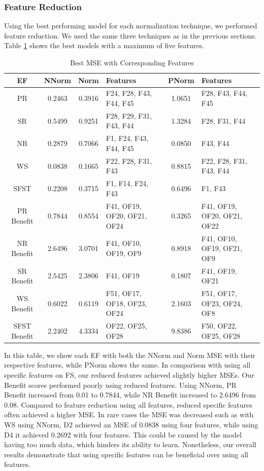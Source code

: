 \documentclass[12pt,letterpaper]{article}
\begin{document}
\subsubsection{Feature Reduction}

Using the best performing model for each normalization technique, we performed feature reduction.
We used the same three techniques as in the previous sections.
Table \ref{reg_spec_tab:featred_res} shows the best models with a maximum of five features.

\begin{table}[H]
\centering
\begin{tabular}{|c|c|c|p{2.5cm}|c|p{2.5cm}|}
\hline
\textbf{\ac{EF}} & \textbf{\ac{NNorm}} & \textbf{Norm} & \textbf{Features} & \textbf{\ac{PNorm}} & \textbf{Features} \\
\hline
PR & 0.2463 & 0.3916 & F24, F28, F43, F44, F45 & 1.0651 & F28, F43, F44, F45 \\
\hline
SR & 0.5499 & 0.9251 & F28, F29, F31, F43, F44 & 1.3284 & F28, F31, F44 \\
\hline
NR & 0.2879 & 0.7066 & F1, F24, F43, F44, F45 & 0.0850 & F43, F44 \\
\hline
WS & 0.0838 & 0.1665 & F22, F28, F31, F43 & 0.8815 & F22, F28, F31, F43, F44 \\
\hline
SFST & 0.2208 & 0.3715 & F1, F14, F24, F43 & 0.6496 & F1, F43 \\
\hline
PR Benefit & 0.7844 & 0.8554 & F41, OF19, OF20, OF21, OF24 & 0.3265 & F41, OF19, OF20, OF21, OF22 \\
\hline
NR Benefit & 2.6496 & 3.0701 & F41, OF10, OF19, OF9 & 0.8918 & F41, OF10, OF19, OF21, OF9 \\
\hline
SR Benefit & 2.5425 & 2.3806 & F41, OF19 & 0.1807 &  F41, OF19, OF21 \\
\hline
WS Benefit & 0.6022 & 0.6119 & F51, OF17, OF18, OF23, OF24 & 2.1603 & F51, OF17, OF23, OF24, OF8 \\
\hline
SFST Benefit & 2.2402 & 4.3334 & OF22, OF25, OF28 & 9.8386 & F50, OF22, OF25, OF28 \\
\hline
\end{tabular}
\caption{Best MSE with Corresponding Features}
\label{reg_spec_tab:featred_res}
\end{table}

In this table, we show each \ac{EF} with both the \ac{NNorm} and \ac{Norm} MSE with their respective features, while \ac{PNorm} shows the same.
In comparison with using all specific features on \ac{FS}, our reduced features achieved slightly higher MSEs.
Our Benefit scores performed poorly using reduced features.
Using \ac{NNorm}, \ac{PR} Benefit increased from 0.01 to 0.7844, while \ac{NR} Benefit increased to 2.6496 from 0.08.
Compared to feature reduction using all features, reduced specific features often achieved a higher MSE.
In rare cases the MSE was decreased such as with \ac{WS} using \ac{NNorm}, D2 achieved an MSE of 0.0838 using four features, while using D4 it achieved 0.2692 with four features.
This could be caused by the model having too much data, which hinders its ability to learn.
Nonetheless, our overall results demonstrate that using specific features can be beneficial over using all features.
\end{document}
